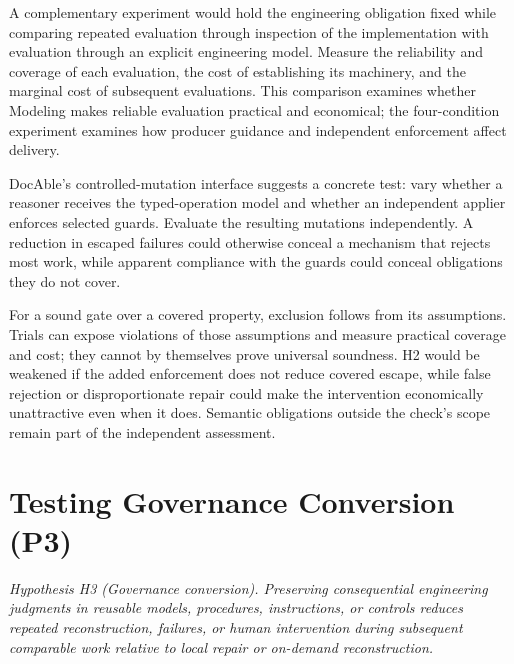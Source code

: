 A complementary experiment would hold the engineering obligation fixed while comparing repeated evaluation through inspection of the implementation with evaluation through an explicit engineering model. Measure the reliability and coverage of each evaluation, the cost of establishing its machinery, and the marginal cost of subsequent evaluations. This comparison examines whether Modeling makes reliable evaluation practical and economical; the four-condition experiment examines how producer guidance and independent enforcement affect delivery.


DocAble's controlled-mutation interface suggests a concrete test: vary whether a reasoner receives the typed-operation model and whether an independent applier enforces selected guards. Evaluate the resulting mutations independently. A reduction in escaped failures could otherwise conceal a mechanism that rejects most work, while apparent compliance with the guards could conceal obligations they do not cover.

For a sound gate over a covered property, exclusion follows from its assumptions. Trials can expose violations of those assumptions and measure practical coverage and cost; they cannot by themselves prove universal soundness. H2 would be weakened if the added enforcement does not reduce covered escape, while false rejection or disproportionate repair could make the intervention economically unattractive even when it does. Semantic obligations outside the check's scope remain part of the independent assessment.

\section{Testing Governance Conversion (P3)}\label{heading:governance-and-engineering-capital}

\emph{Hypothesis H3 (Governance conversion). Preserving consequential engineering judgments in reusable models, procedures, instructions, or controls reduces repeated reconstruction, failures, or human intervention during subsequent comparable work relative to local repair or on-demand reconstruction.}


